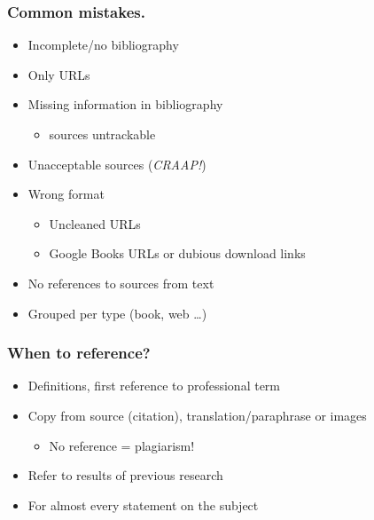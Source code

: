 \documentclass[aspectratio=169]{beamer}
\begin{document}
\begin{frame}
    \frametitle{Common mistakes.}

    \begin{itemize}
        \item Incomplete/no bibliography
        \item Only URLs
        \item Missing information in bibliography
              \begin{itemize}
                  \item[\(\Rightarrow\)] sources untrackable
              \end{itemize}
        \item Unacceptable sources (\emph{CRAAP!})
        \item Wrong format
        	\begin{itemize}
        		\item Uncleaned URLs
        		\item Google Books URLs or dubious download links
        	\end{itemize}
        \item No references to sources from text
        \item Grouped per type (book, web \ldots)
    \end{itemize}
\end{frame}

\begin{frame}
    \frametitle{When to reference?}

    \begin{itemize}
        \item Definitions, first reference to professional term
        \item Copy from source (citation), translation/paraphrase or images
              \begin{itemize}
                  \item No reference = \alert{plagiarism!}
              \end{itemize}
        \item Refer to results of previous research
        \item For almost every statement on the subject
    \end{itemize}

    \bigskip

\end{frame}
\end{document}

